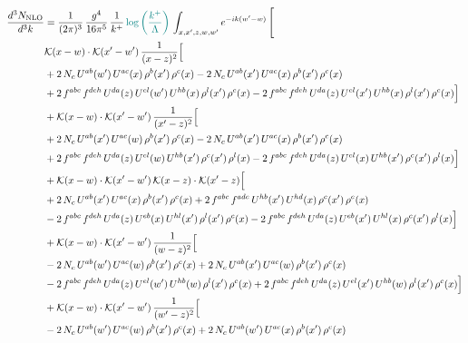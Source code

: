 \documentclass[9pt]{article}
\numberwithin{equation}{section}
\begin{document}
\begin{align}
\frac{d^{3}N_{\mathrm{NLO}}}{d^{3}k} & = \frac{1}{(2\pi)^{3}}\,\frac{g^{4}}{16\pi^{5}}\,\frac{1}{k^{+}}\,{\color{teal}\log{\left(\frac{k^{+}}{\Lambda}\right)}}\,\int_{x,x',z,w,w'}e^{-ik(w'-w)}\,\Bigg[
\notag \\ & \mathcal{K}(x-w)\cdot\mathcal{K}(x'-w')\,\frac{1}{(x-z)^{2}}\Big[\notag\\
&+2\,N_{c}\,U^{ab}(w')\,U^{ac}(x)\,\rho^{b}(x')\,\rho^{c}(x) -2\,N_{c}\,U^{ab}(x')\,U^{ac}(x)\,\rho^{b}(x')\,\rho^{c}(x)\notag\\
& +2\,f^{abc}\,f^{deh}\,U^{da}(z)\,U^{el}(w')\,U^{hb}(x)\,\rho^{l}(x')\,\rho^{c}(x) -2\,f^{abc}\,f^{deh}\,U^{da}(z)\,U^{el}(x')\,U^{hb}(x)\,\rho^{l}(x')\,\rho^{c}(x)\Big]\notag\\
& +\mathcal{K}(x-w)\cdot\mathcal{K}(x'-w')\,\frac{1}{(x'-z)^{2}}\Big[\notag\\
& +2\,N_{c}\,U^{ab}(x')\,U^{ac}(w)\,\rho^{b}(x')\,\rho^{c}(x) -2\,N_{c}\,U^{ab}(x')\,U^{ac}(x)\,\rho^{b}(x')\,\rho^{c}(x)\notag\\
& +2\,f^{abc}\,f^{deh}\,U^{da}(z)\,U^{el}(w)\,U^{hb}(x')\,\rho^{c}(x')\,\rho^{l}(x) -2\,f^{abc}\,f^{deh}\,U^{da}(z)\,U^{el}(x)\,U^{hb}(x')\,\rho^{c}(x')\,\rho^{l}(x)\Big]\notag\\
& +\mathcal{K}(x-w)\cdot\mathcal{K}(x'-w')\,\mathcal{K}(x-z)\cdot\mathcal{K}(x'-z)\Big[\notag\\
& +2\,N_{c}\,U^{ab}(x')\,U^{ac}(x)\,\rho^{b}(x')\,\rho^{c}(x) +2\,f^{abc}\,f^{ade}\,U^{hb}(x')\,U^{hd}(x)\,\rho^{c}(x')\,\rho^{e}(x)\notag\\
& -2\,f^{abc}\,f^{deh}\,U^{da}(z)\,U^{eb}(x)\,U^{hl}(x')\,\rho^{l}(x')\,\rho^{c}(x) -2\,f^{abc}\,f^{deh}\,U^{da}(z)\,U^{eb}(x')\,U^{hl}(x)\,\rho^{c}(x')\,\rho^{l}(x)\Big]\notag\\
& +\mathcal{K}(x-w)\cdot\mathcal{K}(x'-w')\,\frac{1}{(w-z)^{2}}\Big[\notag\\
& -2\,N_{c}\,U^{ab}(w')\,U^{ac}(w)\,\rho^{b}(x')\,\rho^{c}(x) +2\,N_{c}\,U^{ab}(x')\,U^{ac}(w)\,\rho^{b}(x')\,\rho^{c}(x)\notag\\
& -2\,f^{abc}\,f^{deh}\,U^{da}(z)\,U^{el}(w')\,U^{hb}(w)\,\rho^{l}(x')\,\rho^{c}(x) +2\,f^{abc}\,f^{deh}\,U^{da}(z)\,U^{el}(x')\,U^{hb}(w)\,\rho^{l}(x')\,\rho^{c}(x)\Big]\notag\\
& +\mathcal{K}(x-w)\cdot\mathcal{K}(x'-w')\,\frac{1}{(w'-z)^{2}}\Big[\notag\\
& -2\,N_{c}\,U^{ab}(w')\,U^{ac}(w)\,\rho^{b}(x')\,\rho^{c}(x) +2\,N_{c}\,U^{ab}(w')\,U^{ac}(x)\,\rho^{b}(x')\,\rho^{c}(x)\notag\\

\end{align}
\end{document}
